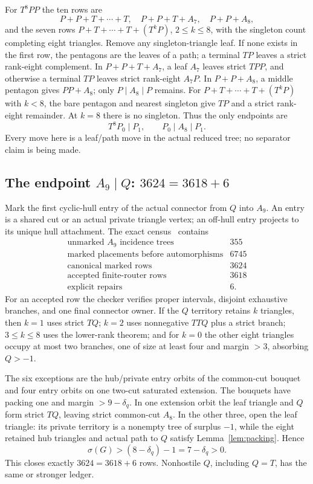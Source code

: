 \documentclass[11pt]{article}
\newcommand{\sig}{\sigma}
\begin{document}
For $T^8PP$ the ten rows are
\[
 P+P+T+\cdots+T,\quad P+P+T+A_7,\quad P+P+A_8,
\]
and the seven rows $P+T+\cdots+T+(T^kP)$, $2\leq k\leq8$, with the singleton
count completing eight triangles.  Remove any singleton-triangle leaf.  If
none exists in the first row, the pentagons are the leaves of a path; a terminal
$TP$ leaves a strict rank-eight complement.  In $P+P+T+A_7$, a leaf $A_7$
leaves strict $TPP$, and otherwise a terminal $TP$ leaves strict rank-eight
$A_7P$.  In $P+P+A_8$, a middle pentagon gives $PP+A_8$; only
$P\mid A_8\mid P$ remains.  For $P+T+\cdots+T+(T^kP)$ with $k<8$, the bare
pentagon and nearest singleton give $TP$ and a strict rank-eight remainder.
At $k=8$ there is no singleton.  Thus the only endpoints are
\begin{equation}\label{eq:dp}
 T^8P_0\mid P_1,\qquad P_0\mid A_8\mid P_1.
\end{equation}
Every move here is a leaf/path move in the actual reduced tree; no separator
claim is being made.

\subsection{The endpoint \texorpdfstring{$A_9\mid Q$}{A9 | Q}:
\texorpdfstring{$3624=3618+6$}{3624 = 3618 + 6}}

Mark the first cyclic-hull entry of the actual connector from $Q$ into $A_9$.
An entry is a shared cut or an actual private triangle vertex; an off-hull entry
projects to its unique hull attachment.  The exact census~\cite{T9QProof,T9QCode}
contains
\[
 \begin{array}{lr}
 \text{unmarked $A_9$ incidence trees}&355\\
 \text{marked placements before automorphisms}&6745\\
 \text{canonical marked rows}&3624\\
 \text{accepted finite-router rows}&3618\\
 \text{explicit repairs}&6.
 \end{array}
\]
For an accepted row the checker verifies proper intervals, disjoint exhaustive
branches, and one final connector owner.  If the $Q$ territory retains $k$
triangles, then $k=1$ uses strict $TQ$; $k=2$ uses nonnegative $TTQ$ plus a
strict branch; $3\leq k\leq8$ uses the lower-rank theorem; and for $k=0$ the
other eight triangles occupy at most two branches, one of size at least four
and margin $>3$, absorbing $Q>-1$.

The six exceptions are the hub/private entry orbits of the common-cut bouquet
and four entry orbits on one two-cut saturated extension.  The bouquets have
packing one and margin $>9-\delta_q$.  In one extension orbit the leaf triangle
and $Q$ form strict $TQ$, leaving strict common-cut $A_8$.  In the other three,
open the leaf triangle: its private territory is a nonempty tree of surplus
$-1$, while the eight retained hub triangles and actual path to $Q$ satisfy
Lemma~\ref{lem:packing}.  Hence
\[
 \sig(G)>(8-\delta_q)-1=7-\delta_q>0.
\]
This closes exactly $3624=3618+6$ rows.  Nonhostile $Q$, including $Q=T$, has
the same or stronger ledger.
\end{document}
